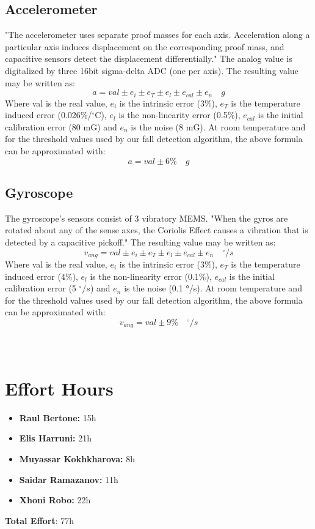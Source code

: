 \documentclass[12pt]{article}
\begin{document}
\subsection{Accelerometer}
"The accelerometer uses separate proof masses for each axis. Acceleration along a particular axis induces displacement on the corresponding proof mass, and capacitive sensors detect the displacement differentially." The analog value is digitalized by three 16bit sigma-delta ADC (one per axis). The resulting value may be written as:
$$ a = val \pm e_i \pm e_T \pm e_l \pm e_{cal} \pm e_n \quad g $$
Where val is the real value, $e_i$ is the intrinsic error (3\%), $e_T$ is the temperature induced error (0.026\%/$^{\circ}$C), $e_l$ is the non-linearity error (0.5\%), $e_{cal}$ is the initial calibration error (80 mG) and $e_n$ is the noise (8 mG). At room temperature and for the threshold values used by our fall detection algorithm, the above formula can be approximated with:
$$ a = val \pm 6\%  \quad g $$

\subsection{Gyroscope}
The gyroscope’s sensors consist of 3 vibratory MEMS. "When the gyros are rotated about any of the sense axes, the Coriolis Effect causes a vibration that is detected by a capacitive pickoff." The resulting value may be written as:
$$ v_{ang} = val \pm e_i  \pm e_T \pm e_l \pm e_{cal} \pm e_n \quad ^{\circ}/s $$
Where val is the real value, $e_i$ is the intrinsic error (3\%), $e_T$ is the temperature induced error (4\%), $e_l$ is the non-linearity error (0.1\%), $e_{cal}$ is the initial calibration error (5 $^{\circ}/s$) and $e_n$ is the noise (0.1 °/s). At room temperature and for the threshold values used by our fall detection algorithm, the above formula can be approximated with:
$$ v_{ang} = val \pm 9\% \quad ^{\circ}/s $$
\\\\

\section{Effort Hours}
\begin{itemize}
	\item \textbf{Raul Bertone:} 15h
	\item \textbf{Elis Harruni:} 21h
	\item \textbf{Muyassar Kokhkharova:} 8h
	\item \textbf{Saidar Ramazanov:} 11h
	\item \textbf{Xhoni Robo:} 22h
\end{itemize}

\textbf{Total Effort}: 77h\\\\
\clearpage
\printbibliography
\end{document}
